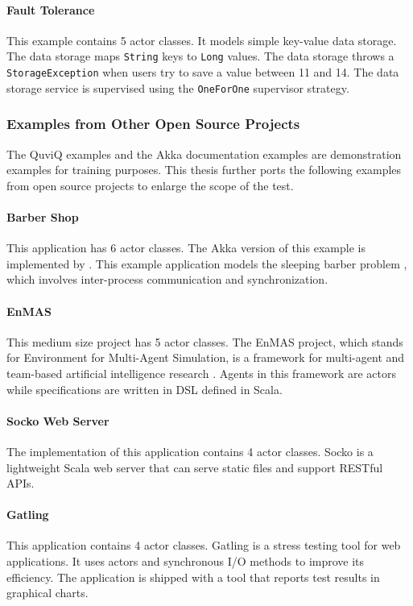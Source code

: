 \paragraph{Fault Tolerance} This example contains 5 actor classes.  It models 
simple key-value data storage.  The data storage maps {\tt String} keys to 
{\tt Long} values.  The data storage throws a {\tt StorageException} when 
users try to save a value between 11 and 14.  The data storage service is 
supervised using the {\tt OneForOne} supervisor strategy.


\subsubsection{Examples from Other Open Source Projects}

The QuviQ examples and the Akka documentation examples are demonstration 
examples for training purposes.  This thesis further ports the following 
examples from open source projects to enlarge the scope of the test.

\paragraph{Barber Shop}  This application has 6 actor classes.  The Akka 
version of this example is implemented by \citet{BarberShop}.  This example
application models the sleeping barber problem \citep{wiki:barber}, which 
involves inter-process communication and synchronization.

\paragraph{EnMAS} This medium size project has 5 actor classes.  The EnMAS 
project, which stands for Environment for Multi-Agent Simulation, is a framework 
for multi-agent and team-based artificial intelligence research \citep{EnMAS}.  
Agents in this framework are actors while specifications are written in DSL 
defined in Scala.


\paragraph{Socko Web Server} The implementation of this application contains 
4 actor classes.  Socko \citep{SOCKO} is a lightweight Scala web server that 
can serve static files and support RESTful APIs.  

\paragraph{Gatling}  This application contains 4 actor classes.  Gatling  
\citep{Gatling} is a stress testing tool for web applications.  It uses actors 
and synchronous I/O methods to improve its efficiency.  The application is 
shipped with a tool that reports test results in graphical charts.

